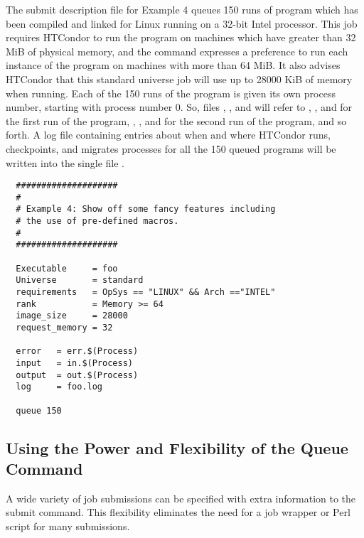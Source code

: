 The submit description file for Example 4 queues 150
runs of program  which has been compiled and linked for
Linux running on a 32-bit Intel processor.
This job requires HTCondor to run the program on machines which have
greater than 32 MiB of physical memory, 
and the  command expresses a
preference to run each instance of the program 
on machines with more than 64 MiB.
It also advises HTCondor that this standard universe job will
use up to 28000 KiB of memory when running.
Each of the 150 runs of the program is given its own process number,
starting with process number 0.
So, files 
, , and  will
refer to , , and  for the first run
of the program,
, ,
and  for the second run of the program, and so forth.
A log file containing entries
about when and where HTCondor runs, checkpoints, and migrates processes for
all the 150 queued programs
will be written into the single file .
\begin{verbatim}
  ####################                    
  #
  # Example 4: Show off some fancy features including
  # the use of pre-defined macros.
  #
  ####################                                                    

  Executable     = foo                                                    
  Universe       = standard                                                    
  requirements   = OpSys == "LINUX" && Arch =="INTEL"     
  rank           = Memory >= 64
  image_size     = 28000
  request_memory = 32

  error   = err.$(Process)                                                
  input   = in.$(Process)                                                 
  output  = out.$(Process)                                                
  log     = foo.log

  queue 150
\end{verbatim}


\subsection{\label{sec:user-man-queue}Using the Power and Flexibility of the Queue Command}

A wide variety of job submissions can be specified
with extra information to the  submit command.
This flexibility eliminates the need for a job wrapper or Perl script 
for many submissions.

